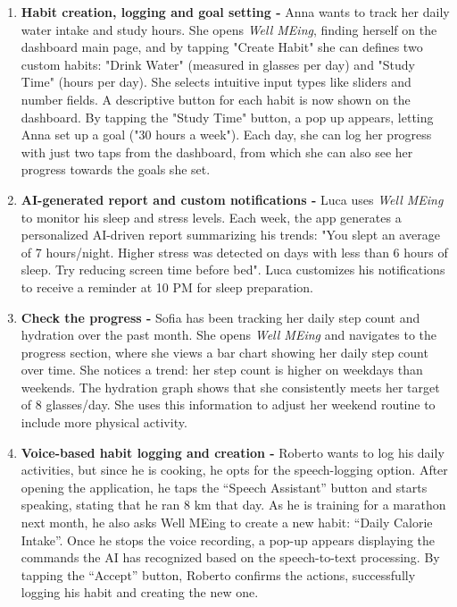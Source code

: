 \documentclass{article}
\begin{document}
\vspace{5pt}
\begin{enumerate}[label=\textbf{S\arabic* -}]
    \setlength{\itemsep}{5pt}

    \item \textbf{Habit creation, logging and goal setting -}
        Anna wants to track her daily water intake and study hours.
        She opens \textit{Well MEing}, finding herself on the dashboard main page, and by tapping "Create Habit" she can defines two custom habits: "Drink Water" (measured in glasses per day) and "Study Time" (hours per day).
        She selects intuitive input types like sliders and number fields.
        A descriptive button for each habit is now shown on the dashboard.
        By tapping the "Study Time" button, a pop up appears, letting Anna set up a goal ("30 hours a week").
        Each day, she can log her progress with just two taps from the dashboard, from which she can also see her progress towards the goals she set.

    \item \textbf{AI-generated report and custom notifications -}
        Luca uses \textit{Well MEing} to monitor his sleep and stress levels.
        Each week, the app generates a personalized AI-driven report summarizing his trends: "You slept an average of 7 hours/night. Higher stress was detected on days with less than 6 hours of sleep. Try reducing screen time before bed".
        Luca customizes his notifications to receive a reminder at 10 PM for sleep preparation.

    \item \textbf{Check the progress -}
        Sofia has been tracking her daily step count and hydration over the past month.
        She opens \textit{Well MEing} and navigates to the progress section, where she views a bar chart showing her daily step count over time.
        She notices a trend: her step count is higher on weekdays than weekends.
        The hydration graph shows that she consistently meets her target of 8 glasses/day.
        She uses this information to adjust her weekend routine to include more physical activity.

    \item \textbf{Voice-based habit logging and creation -}
        Roberto wants to log his daily activities, but since he is cooking, he opts for the speech-logging option.
        After opening the application, he taps the “Speech Assistant” button and starts speaking, stating that he ran 8 km that day.
        As he is training for a marathon next month, he also asks Well MEing to create a new habit: “Daily Calorie Intake”.
        Once he stops the voice recording, a pop-up appears displaying the commands the AI has recognized based on the speech-to-text processing.
        By tapping the “Accept” button, Roberto confirms the actions, successfully logging his habit and creating the new one.

\end{enumerate}
\end{document}

